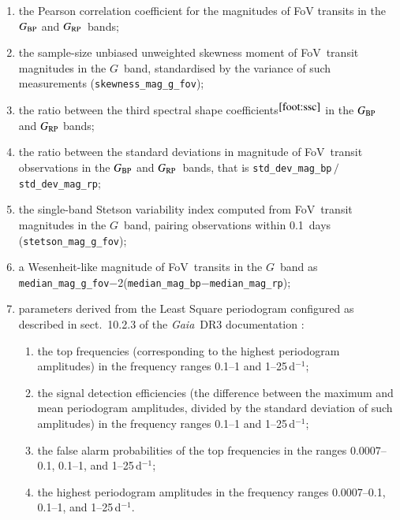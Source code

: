 \documentclass[longauth]{aa}
\def\gdr3{\textit{Gaia}~DR3\xspace}
\def\g{$G$\xspace}
\def\bp{$G_{\rm BP}$\xspace}
\def\rp{$G_{\rm RP}$\xspace}
\begin{document}
\begin{appendix}
\begin{enumerate}
\item the Pearson correlation coefficient for the magnitudes of FoV transits in the \bp and \rp~bands;
\item the sample-size unbiased unweighted skewness moment of FoV~transit magnitudes in the \g~band, standardised by the variance of such measurements ({\texttt{skewness\_mag\_g\_fov}});
\item the ratio between the third spectral shape coefficients$^{\rm \ref{foot:ssc}}$ in the \bp and \rp bands;  
\item the ratio between the standard deviations in magnitude of FoV~transit observations in the \bp and \rp~bands, that is {\texttt{std\_dev\_mag\_bp}}\,$/$\,{\texttt{std\_dev\_mag\_rp}}; 
\item the single-band Stetson variability index \citep{1996PASP..108..851S} computed from FoV~transit magnitudes in the \g~band, pairing observations within 0.1~days (\texttt{stetson\_mag\_g\_fov});
\item a Wesenheit-like magnitude of FoV~transits in the \g~band as {\texttt{median\_mag\_g\_fov}}$-$2({\texttt{median\_mag\_bp}}$-${\texttt{median\_mag\_rp}});
\item parameters derived from the Least Square periodogram \citep{1985A&AS...59...63H,2009A&A...496..577Z} configured as described in sect.~10.2.3 of the \gdr3 documentation \citep{2022gdr3.reptE..10R}: 
\begin{enumerate}
    \item the top frequencies (corresponding to the highest periodogram amplitudes) in the frequency ranges 0.1--1 and 1--25\,d$^{-1}$; 
    \item the signal detection efficiencies (the difference between the maximum and mean periodogram amplitudes, divided by the standard deviation of such amplitudes) in the frequency ranges 0.1--1 and 1--25\,d$^{-1}$;  
    \item the false alarm probabilities \citep{2009MNRAS.395.1541B} of the top frequencies in the ranges 0.0007--0.1, 0.1--1, and 1--25\,d$^{-1}$;
    \item the highest periodogram amplitudes in the frequency ranges 0.0007--0.1, 0.1--1, and 1--25\,d$^{-1}$.
\end{enumerate}
\end{enumerate}



\end{appendix}
\end{document}
